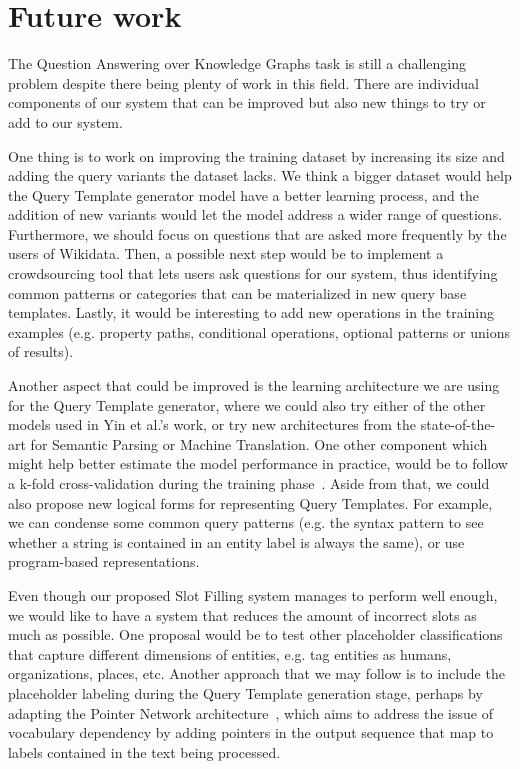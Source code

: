 \section{Future work}
\label{cap6:conclusions/futureWork}
The Question Answering over Knowledge Graphs task is still a challenging problem despite there being 
plenty of work in this field. There are individual components of our system that can be improved but 
also new things to try or add to our system.

One thing is to work on improving the training dataset by increasing its size and adding the \SPARQL{} 
query variants the \LCQuADtwo{} dataset lacks. We think a bigger dataset would help the Query Template 
generator model have a better learning process, and the addition of new variants would let the model 
address a wider range of questions. Furthermore, we should focus on questions that are asked more 
frequently by the users of Wikidata. Then, a possible next step would be to implement a crowdsourcing 
tool that lets users ask questions for our system, thus identifying common patterns or categories 
that can be materialized in new query base templates. Lastly, it would be interesting to add new 
operations in the training examples (e.g. property paths, conditional operations, optional patterns 
or unions of results).

Another aspect that could be improved is the learning architecture we are using for the Query 
Template generator, where we could also try either of the other models used in Yin et al.'s work, or 
try new architectures from the state-of-the-art for Semantic Parsing or Machine Translation. One 
other component which might help better estimate the model performance in practice, would be to 
follow a k-fold cross-validation during the training phase~\cite{futureWork:anguita2012k}. Aside 
from that, we could also propose new logical forms for representing Query Templates. For example, we 
can condense some common query patterns (e.g. the syntax pattern to see whether a string is contained 
in an entity label is always the same), or use program-based representations. 

Even though our proposed Slot Filling system manages to perform well enough, we would like to have a 
system that reduces the amount of incorrect slots as much as possible. One proposal would be to 
test other placeholder classifications that capture different dimensions of entities, e.g. tag 
entities as humans, organizations, places, etc. Another approach that we may 
follow is to include the placeholder labeling during the Query Template generation stage, perhaps by 
adapting the Pointer Network architecture~\cite{key:vinyals2015pointer}, which 
aims to address the issue of vocabulary dependency by adding pointers in the output sequence that 
map to labels contained in the text being processed.

